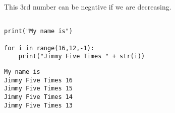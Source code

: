 \documentclass[11pt]{article}
\begin{document}
This 3rd number can be negative if we are decreasing.


\begin{verbatim}

print("My name is")

for i in range(16,12,-1):
    print("Jimmy Five Times " + str(i))

\end{verbatim}

\begin{verbatim}
My name is
Jimmy Five Times 16
Jimmy Five Times 15
Jimmy Five Times 14
Jimmy Five Times 13
\end{verbatim}
\end{document}
